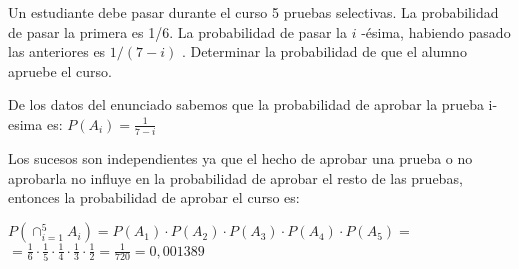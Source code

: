 \problem

Un estudiante debe pasar durante el curso 5 pruebas selectivas. La
probabilidad de pasar la primera es 1/6. La probabilidad de pasar la
$ i $ -ésima, habiendo pasado las anteriores es   $ 1 / ( 7 -i) $ . Determinar la
probabilidad de que el alumno apruebe el curso.

	\begin{flushleft}
		De los datos del enunciado sabemos que la probabilidad de aprobar la prueba i-esima es: $P(A_{i}) = \frac{1}{7-i}$
	\end{flushleft}

\begin{flushleft}
	Los sucesos son independientes ya que el hecho de aprobar una prueba o no aprobarla no influye en la probabilidad de aprobar el resto de las pruebas, entonces la probabilidad de aprobar el curso es: 
\end{flushleft}

$P(\cap^{5}_{i=1} A_{i}) = P(A_{1})\cdot P(A_{2})\cdot P(A_{3})\cdot P(A_{4})\cdot P(A_{5}) = $ \\ $=\frac{1}{6} \cdot \frac{1}{5} \cdot \frac{1}{4} \cdot \frac{1}{3} \cdot \frac{1}{2} = \frac{1}{720} = 0,001389$

